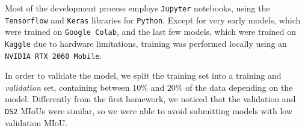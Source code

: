 \documentclass[11pt]{article}
\begin{document}
\begin{multicols}{2}


      Most of the development process employs \texttt{Jupyter} notebooks, using the \texttt{Tensorflow}\cite{TensorFlow} and \texttt{Keras}\cite{chollet2015keras} libraries for \texttt{Python}. Except for very early models, which were trained on \texttt{Google Colab}, and the last few models, which were trained on \texttt{Kaggle} due to hardware limitations, training was performed locally using an \texttt{NVIDIA RTX 2060 Mobile}.

      In order to validate the model, we split the training set into a training and \textit{validation} set, containing between $10\%$ and $20\%$ of the data depending on the model. Differently from the first homework, we noticed that the validation and \texttt{DS2} MIoUs were similar, so we were able to avoid submitting models with low validation MIoU.


\end{multicols}
\end{document}
